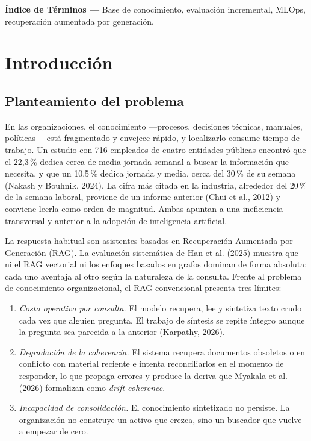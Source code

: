 \documentclass[11pt,letterpaper]{article}
\begin{document}
\vspace{8pt}
\noindent\textbf{Índice de Términos —} Base de conocimiento, evaluación incremental, MLOps,
recuperación aumentada por generación.

\section{Introducción}

\subsection{Planteamiento del problema}

En las organizaciones, el conocimiento —procesos, decisiones técnicas, manuales, políticas— está
fragmentado y envejece rápido, y localizarlo consume tiempo de trabajo. Un estudio con 716 empleados
de cuatro entidades públicas encontró que el 22,3\,\% dedica cerca de media jornada semanal a buscar
la información que necesita, y que un 10,5\,\% dedica jornada y media, cerca del 30\,\% de su semana
(Nakash y Bouhnik, 2024). La cifra más citada en la industria, alrededor del 20\,\% de la semana
laboral, proviene de un informe anterior (Chui et al., 2012) y conviene leerla como orden de
magnitud. Ambas apuntan a una ineficiencia transversal y anterior a la adopción de inteligencia
artificial.

La respuesta habitual son asistentes basados en Recuperación Aumentada por Generación (RAG). La
evaluación sistemática de Han et al. (2025) muestra que ni el RAG vectorial ni los enfoques basados
en grafos dominan de forma absoluta: cada uno aventaja al otro según la naturaleza de la consulta.
Frente al problema de conocimiento organizacional, el RAG convencional presenta tres límites:

\begin{enumerate}
\item \textit{Costo operativo por consulta.} El modelo recupera, lee y sintetiza texto crudo cada vez
que alguien pregunta. El trabajo de síntesis se repite íntegro aunque la pregunta sea parecida a la
anterior (Karpathy, 2026).
\item \textit{Degradación de la coherencia.} El sistema recupera documentos obsoletos o en conflicto
con material reciente e intenta reconciliarlos en el momento de responder, lo que propaga errores y
produce la deriva que Myakala et al. (2026) formalizan como \textit{drift coherence}.
\item \textit{Incapacidad de consolidación.} El conocimiento sintetizado no persiste. La organización
no construye un activo que crezca, sino un buscador que vuelve a empezar de cero.
\end{enumerate}
\end{document}
